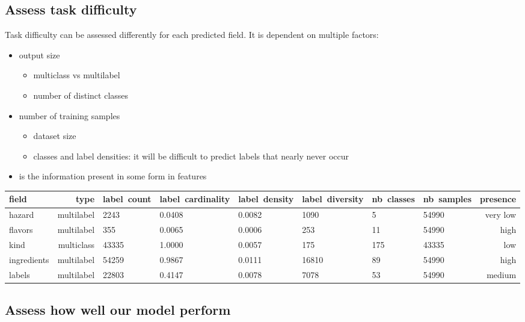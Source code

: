 \subsection{Assess task difficulty}
Task difficulty can be assessed differently for each predicted field. It is dependent on multiple factors:
\begin{itemize}
	\item output size
	\begin{itemize}
		\item multiclass vs multilabel
		\item number of distinct classes
	\end{itemize}
	\item number of training samples
	\begin{itemize}
		\item dataset size
		\item classes and label densities: it will be difficult to predict labels that nearly never occur
	\end{itemize}
	\item is the information present in some form in features
\end{itemize}

\begin{tabularx}{\textwidth}{|l|r|X|X|X|X|X|X|r|}
\toprule
field & type &  label\ count & label\ cardinality &  label\ density &  label\ diversity &  nb\ classes &  nb\ samples & presence \\
\midrule
hazard			      &          multilabel &    2243     &     0.0408 &         0.0082 &             1090 &           5 &       54990 & very low\\
flavors               &          multilabel &    355      &     0.0065 &         0.0006 &              253 &          11 &       54990 & high \\
kind                  &          multiclass &    43335    &     1.0000 &         0.0057 &              175 &         175 &       43335 & low \\
ingredients			  &          multilabel &    54259    &     0.9867 &         0.0111 &            16810 &          89 &       54990 & high \\
labels 		          &          multilabel &    22803    &     0.4147 &         0.0078 &             7078 &          53 &       54990 & medium \\
\bottomrule
\end{tabularx}


\subsection{Assess how well our model perform}



